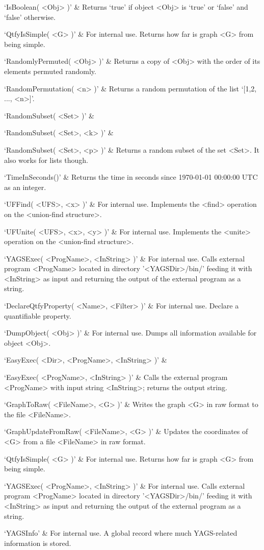 `IsBoolean( <Obj> )' & 
Returns `true' if object <Obj> is `true' or `false' and `false' otherwise.

`QtfyIsSimple( <G> )' & 
For internal use. Returns how far is graph <G> from being simple.

`RandomlyPermuted( <Obj> )' & 
Returns  a copy of <Obj> with the order of its elements permuted randomly.

`RandomPermutation( <n> )' & 
Returns a random permutation of the list `[1,2, ..., <n>]'.

`RandomSubset( <Set> )' &

`RandomSubset( <Set>, <k> )' &

`RandomSubset( <Set>, <p> )' &
Returns a random subset of the set <Set>. It also works for lists though.

`TimeInSeconds()' & 
Returns the time in seconds since 1970-01-01 00:00:00 UTC as an integer.

`UFFind( <UFS>, <x> )' & 
For  internal  use.  Implements  the  <find>  operation on the <union-find structure>. 

`UFUnite( <UFS>, <x>, <y> )' & 
For  internal  use.  Implements  the  <unite> operation on the <union-find structure>.

`YAGSExec( <ProgName>, <InString> )' & 
For  internal  use.  Calls  external  program  <ProgName> located in directory
'<YAGSDir>/bin/'  feeding  it with <InString> as input and returning  the
output  of  the  external  program  as a string.
\enditems


\beginitems
`DeclareQtfyProperty( <Name>, <Filter> )' & 
For internal use. Declare a quantifiable property.

`DumpObject( <Obj> )' & 
For internal use. Dumps  all information available for object <Obj>.

`EasyExec( <Dir>, <ProgName>, <InString> )' & 

`EasyExec( <ProgName>, <InString> )' & 
Calls the external program <ProgName> with input string <InString>; returns the output string.

`GraphToRaw( <FileName>, <G> )' & 
Writes the graph <G> in raw format to the file  <FileName>.

`GraphUpdateFromRaw( <FileName>, <G> )' & 
Updates  the  coordinates  of  <G>  from  a file <FileName> in raw format.

`QtfyIsSimple( <G> )' & 
For internal use. Returns how far is graph <G> from being simple.

`YAGSExec( <ProgName>, <InString> )' & 
For  internal  use.  Calls  external  program  <ProgName> located in directory
'<YAGSDir>/bin/'  feeding  it with <InString> as input and returning  the
output  of  the  external  program  as a string.

`YAGSInfo' &
For internal use. A global record where much YAGS-related information is stored.
\enditems

%
%
%
%


